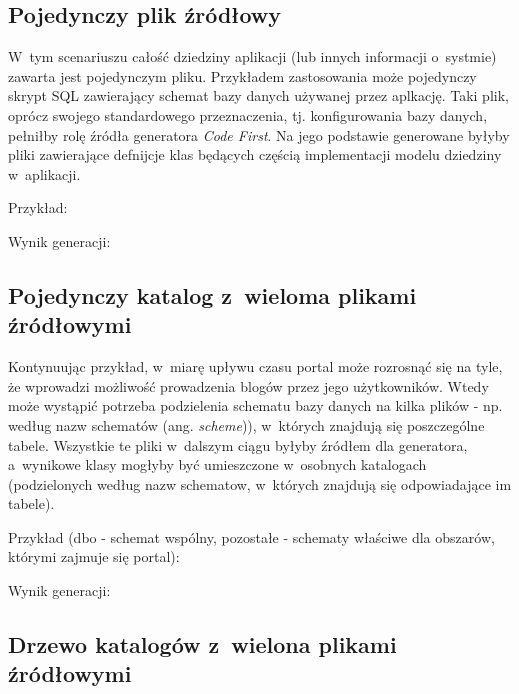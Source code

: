 \subsection{Pojedynczy plik źródłowy}

W~tym scenariuszu całość dziedziny aplikacji (lub innych informacji o~systmie) zawarta jest pojedynczym pliku.
Przykładem zastosowania może pojedynczy skrypt SQL zawierający schemat bazy danych używanej przez aplkację.
Taki plik, oprócz swojego standardowego przeznaczenia, tj. konfigurowania bazy danych, pełniłby rolę źródła generatora \emph{Code First}.
Na jego podstawie generowane byłyby pliki zawierające defnijcje klas będących częścią implementacji modelu dziedziny w~aplikacji.

Przykład:



Wynik generacji:



\subsection{Pojedynczy katalog z~wieloma plikami źródłowymi}

Kontynuując przykład, w~miarę upływu czasu portal może rozrosnąć się na tyle, że wprowadzi możliwość prowadzenia blogów przez jego użytkowników.
Wtedy może wystąpić potrzeba podzielenia schematu bazy danych na kilka plików - np. według nazw schematów (ang. \emph{scheme})), w~których znajdują się poszczególne tabele.
Wszystkie te pliki w~dalszym ciągu byłyby źródłem dla generatora, a~wynikowe klasy mogłyby być umieszczone w~osobnych katalogach (podzielonych według nazw schematow, w~których znajdują się odpowiadające im tabele).

Przykład (dbo - schemat wspólny, pozostałe - schematy właściwe dla obszarów, którymi zajmuje się portal):


Wynik generacji:



\subsection{Drzewo katalogów z~wielona plikami źródłowymi}


